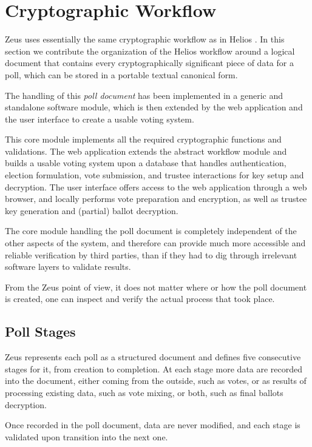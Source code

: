 \documentclass[letterpaper,10pt]{article}
\begin{document}
\section{Cryptographic Workflow}
\label{sec:crypto_workflow}

Zeus uses essentially the same cryptographic workflow as in Helios
\cite{adida:2008}.
In this section we contribute the organization of the Helios workflow
around a logical document that contains every cryptographically
significant piece of data for a poll,
which can be stored in a portable textual canonical form.

The handling of this \emph{poll document} has been implemented in a
generic and standalone software module, which is then extended by the
web application and the user interface to create a usable voting system.

This core module implements all the required cryptographic functions and
validations. The web application extends the abstract workflow module
and builds a usable voting system upon a database
that handles authentication, election formulation, vote submission,
and trustee interactions for key setup and decryption.
The user interface offers access to the web application through
a web browser, and locally performs vote preparation and encryption,
as well as trustee key generation and (partial) ballot decryption.

The core module handling the poll document is completely independent of
the other aspects of the system, and therefore can provide much more
accessible and reliable verification by third parties, than if they
had to dig through irrelevant software layers to validate results.

From the Zeus point of view, it does not matter where or how the poll
document is created, one can inspect and verify the actual process
that took place.

\subsection{Poll Stages}
Zeus represents each poll as a structured document
and defines five consecutive stages for it, from creation to completion.
At each stage more data are recorded into the document,
either coming from the outside, such as votes,
or as results of processing existing data, such as vote mixing,
or both, such as final ballots decryption.

Once recorded in the poll document, data are never modified,
and each stage is validated upon transition into the next one.
\end{document}
